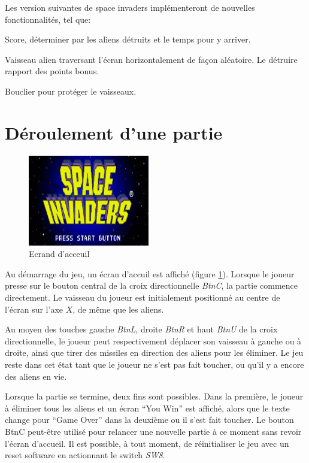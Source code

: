 \documentclass[french]{nakrule}
\begin{document}
Les version suivantes de space invaders implémenteront de nouvelles
fonctionnalités, tel que:\vspace{.1in}
\begin{items}
\item Score, déterminer par les aliens détruits et le temps pour y arriver.
\item Vaisseau alien traversant l'écran horizontalement de façon aléatoire. Le
  détruire rapport des points bonus.
\item Bouclier pour protéger le vaisseaux.
\end{items}

\clearpage

\section{Déroulement d'une partie}
\label{sec:deroulementPartie}

\begin{figure}
  \centering
  \includegraphics[width=.5\textwidth]{../ROM/pictures/startScreen}
  \caption{Ecrand d'acceuil}
  \label{gameTitle}
\end{figure}

Au démarrage du jeu, un écran d'accuil est affiché (figure \ref{gameTitle}).
Lorsque le joueur presse sur le bouton central de la croix directionnelle \emph{BtnC}, la
partie commence directement. Le vaisseau du joueur est initialement positionné
au centre de l'écran sur l'axe $X$, de même que les aliens.

Au moyen des touches gauche \emph{BtnL}, droite \emph{BtnR} et haut \emph{BtnU}
de la croix directionnelle, le joueur peut respectivement déplacer son vaisseau
à gauche ou à droite, ainsi que tirer des missiles en direction des aliens pour
les éliminer. Le jeu reste dans cet état tant que le joueur ne s'est pas fait
toucher, ou qu'il y a encore des aliens en vie.

Lorsque la partie se termine, deux fins sont possibles.
Dans la première, le joueur à éliminer tous les aliens et un écran ``You Win'' est affiché, alors que le texte change
pour ``Game Over'' dans la deuxième ou il s'est fait toucher. Le bouton BtnC peut-être utilisé pour
relancer une nouvelle partie à ce moment sans revoir l'écran d'accueil. Il est possible, à tout moment, de réinitialiser le jeu avec un reset software
en actionnant le switch \emph{SW8}.
\end{document}
